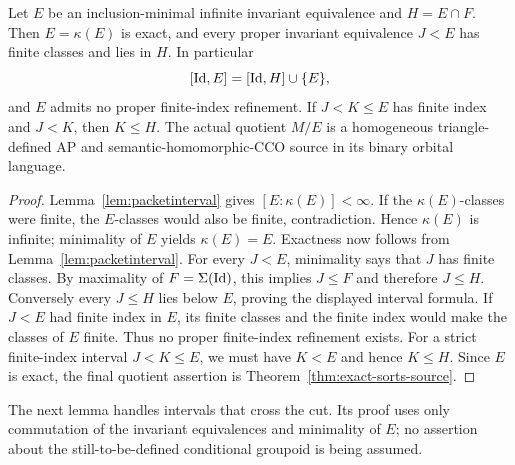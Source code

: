 \begin{proposition}
\label{prop:minimalcut}
Let $E$ be an inclusion-minimal infinite invariant equivalence and
$H=E\cap F$.  Then $E=\kappa(E)$ is exact, and every proper
invariant equivalence $J<E$ has finite classes and lies in $H$.
In particular
\[
 [\mathrm{Id},E]=[\mathrm{Id},H]\cup\{E\},
\]
and $E$ admits no proper finite-index refinement.  If
$J<K\le E$ has finite index and $J<K$, then $K\le H$.
The actual quotient $M/E$ is a homogeneous triangle-defined AP and
semantic-homomorphic-CCO source in its binary orbital language.
\end{proposition}
\begin{proof}
Lemma~\ref{lem:packetinterval} gives $[E:\kappa(E)]<\infty$.
If the $\kappa(E)$-classes were finite, the $E$-classes would
also be finite, contradiction.  Hence $\kappa(E)$ is infinite;
minimality of $E$ yields $\kappa(E)=E$.  Exactness now follows
from Lemma~\ref{lem:packetinterval}.
For every $J<E$, minimality says that $J$ has finite classes.
By maximality of $F=\Sigma(\mathrm{Id})$, this implies $J\le F$ and
therefore $J\le H$.  Conversely every $J\le H$ lies below $E$,
proving the displayed interval formula.  If $J<E$ had finite
index in $E$, its finite classes and the finite index would
make the classes of $E$ finite.  Thus no proper finite-index
refinement exists.  For a strict finite-index interval $J<K\le E$,
we must have $K<E$ and hence $K\le H$.  Since $E$ is exact,
the final quotient assertion is Theorem~\ref{thm:exact-sorts-source}.
\end{proof}

The next lemma handles intervals that cross the cut.  Its proof uses
only commutation of the invariant equivalences and minimality of $E$;
no assertion about the still-to-be-defined conditional groupoid is
being assumed.

